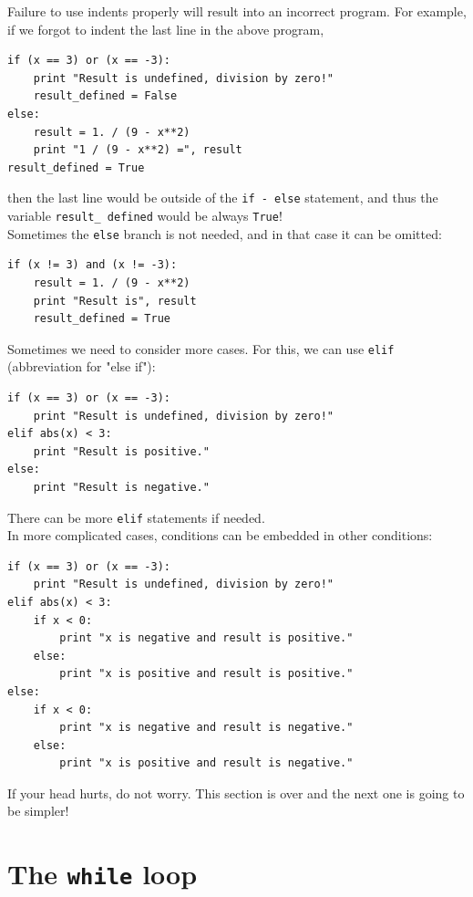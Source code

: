\documentclass[article,A4,12pt]{llncs}
\begin{document}
Failure to use indents properly will result into an incorrect program. For 
example, if we forgot to indent the last line in the above program,

\begin{verbatim}
if (x == 3) or (x == -3):
    print "Result is undefined, division by zero!"
    result_defined = False
else:
    result = 1. / (9 - x**2)
    print "1 / (9 - x**2) =", result
result_defined = True
\end{verbatim}
then the last line would be outside of the {\tt if - else} statement, and
thus the variable {\tt result\_ defined} would be always {\tt True}!\\

\noindent
Sometimes the {\tt else} branch is not needed, and in that case it can be omitted:

\begin{verbatim}
if (x != 3) and (x != -3):
    result = 1. / (9 - x**2)
    print "Result is", result
    result_defined = True
\end{verbatim}
Sometimes we need to consider more cases. For this, we can use {\tt elif}
(abbreviation for "else if"):

\begin{verbatim}
if (x == 3) or (x == -3):
    print "Result is undefined, division by zero!"
elif abs(x) < 3:
    print "Result is positive."
else:
    print "Result is negative."
\end{verbatim}
There can be more {\tt elif} statements if needed. \\

\noindent
In more complicated cases, conditions can be embedded in other conditions:

\begin{verbatim}
if (x == 3) or (x == -3):
    print "Result is undefined, division by zero!"
elif abs(x) < 3:
    if x < 0:
        print "x is negative and result is positive."
    else: 
        print "x is positive and result is positive."
else:
    if x < 0:
        print "x is negative and result is negative."
    else: 
        print "x is positive and result is negative."
\end{verbatim}
If your head hurts, do not worry. This section is over 
and the next one is going to be simpler!

\section{The {\tt while} loop}\label{sec:while}
\end{document}
